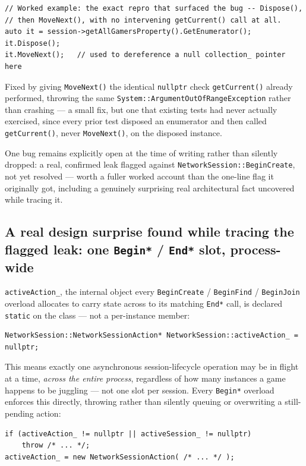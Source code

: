 \begin{lstlisting}
// Worked example: the exact repro that surfaced the bug -- Dispose(),
// then MoveNext(), with no intervening getCurrent() call at all.
auto it = session->getAllGamersProperty().GetEnumerator();
it.Dispose();
it.MoveNext();   // used to dereference a null collection_ pointer here
\end{lstlisting}

Fixed by giving \texttt{MoveNext()} the identical \texttt{nullptr} check
\texttt{getCurrent()} already performed, throwing the same
\texttt{System::ArgumentOutOfRangeException} rather than crashing --- a small fix, but one that
existing tests had never actually exercised, since every prior test disposed an enumerator and
then called \texttt{getCurrent()}, never \texttt{MoveNext()}, on the disposed instance.

One bug remains explicitly open at the time of writing rather than silently dropped: a real,
confirmed leak flagged against \texttt{NetworkSession::BeginCreate}, not yet resolved --- worth
a fuller worked account than the one-line flag it originally got, including a genuinely
surprising real architectural fact uncovered while tracing it.

\subsection{A real design surprise found while tracing the flagged leak: one \texttt{Begin*} / \texttt{End*} slot, process-wide}

\texttt{activeAction\_}, the internal object every \texttt{BeginCreate} / \texttt{BeginFind} /
\texttt{BeginJoin} overload allocates to carry state across to its matching \texttt{End*} call,
is declared \texttt{static} on the class --- not a per-instance member:

\begin{lstlisting}
NetworkSession::NetworkSessionAction* NetworkSession::activeAction_ = nullptr;
\end{lstlisting}

This means exactly one asynchronous session-lifecycle operation may be in flight at a time,
\emph{across the entire process}, regardless of how many  instances a
game happens to be juggling --- not one slot per session. Every \texttt{Begin*} overload
enforces this directly, throwing rather than silently queuing or overwriting a still-pending
action:

\begin{lstlisting}
if (activeAction_ != nullptr || activeSession_ != nullptr)
    throw /* ... */;
activeAction_ = new NetworkSessionAction( /* ... */ );
\end{lstlisting}


